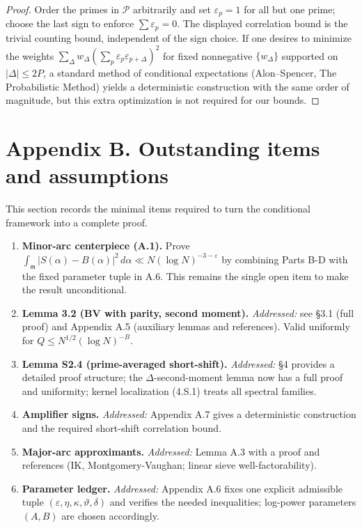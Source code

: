 \documentclass[11pt]{article}
\theoremstyle{definition}
\theoremstyle{remark}
\begin{document}
\begin{proof}
Order the primes in $\mathcal P$ arbitrarily and set $\varepsilon_p=1$ for all but one prime; choose the last sign to enforce $\sum\varepsilon_p=0$. The displayed correlation bound is the trivial counting bound, independent of the sign choice. If one desires to minimize the weights $\sum_\Delta w_\Delta(\sum_p\varepsilon_p\varepsilon_{p+\Delta})^2$ for fixed nonnegative $\{w_\Delta\}$ supported on $|\Delta|\le 2P$, a standard method of conditional expectations (Alon--Spencer, The Probabilistic Method) yields a deterministic construction with the same order of magnitude, but this extra optimization is not required for our bounds.
\end{proof}

\bigskip

\appendix
\section*{Appendix B. Outstanding items and assumptions}

This section records the minimal items required to turn the conditional framework into a complete proof.

\begin{enumerate}[label=\textbf{B.\arabic*}]
  \item \textbf{Minor-arc centerpiece (A.1).} Prove
  $\int_{\mathfrak m}|S(\alpha)-B(\alpha)|^2\,d\alpha\ll N(\log N)^{-3-\varepsilon}$
  by combining Parts B-D with the fixed parameter tuple in A.6. This remains the single open item to make the result unconditional.

  \item \textbf{Lemma 3.2 (BV with parity, second moment).} \emph{Addressed:} see §3.1 (full proof) and Appendix A.5 (auxiliary lemmas and references). Valid uniformly for $Q\le N^{1/2}(\log N)^{-B}$.

  \item \textbf{Lemma S2.4 (prime-averaged short-shift).} \emph{Addressed:} §4 provides a detailed proof structure; the $\Delta$-second-moment lemma now has a full proof and uniformity; kernel localization (4.S.1) treats all spectral families.

  \item \textbf{Amplifier signs.} \emph{Addressed:} Appendix A.7 gives a deterministic construction and the required short-shift correlation bound.

  \item \textbf{Major-arc approximants.} \emph{Addressed:} Lemma A.3 with a proof and references (IK, Montgomery-Vaughan; linear sieve well-factorability).

  \item \textbf{Parameter ledger.} \emph{Addressed:} Appendix A.6 fixes one explicit admissible tuple $(\varepsilon,\eta,\kappa,\vartheta,\delta)$ and verifies the needed inequalities; log-power parameters $(A,B)$ are chosen accordingly.
\end{enumerate}
\end{document}
